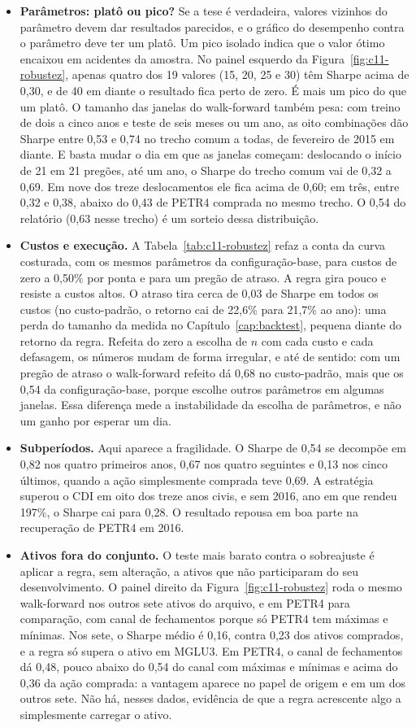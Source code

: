 \begin{itemize}[itemsep=4pt]
  \item \textbf{Parâmetros: platô ou pico?} Se a tese é verdadeira, valores vizinhos do parâmetro devem dar resultados parecidos, e o gráfico do desempenho contra o parâmetro deve ter um platô. Um pico isolado indica que o valor ótimo encaixou em acidentes da amostra. No painel esquerdo da Figura~\ref{fig:c11-robustez}, apenas quatro dos 19 valores (15, 20, 25 e 30) têm Sharpe acima de 0,30, e de 40 em diante o resultado fica perto de zero. É mais um pico do que um platô. O tamanho das janelas do walk-forward também pesa: com treino de dois a cinco anos e teste de seis meses ou um ano, as oito combinações dão Sharpe entre 0,53 e 0,74 no trecho comum a todas, de fevereiro de 2015 em diante. E basta mudar o dia em que as janelas começam: deslocando o início de 21 em 21 pregões, até um ano, o Sharpe do trecho comum vai de 0,32 a 0,69. Em nove dos treze deslocamentos ele fica acima de 0,60; em três, entre 0,32 e 0,38, abaixo do 0,43 de PETR4 comprada no mesmo trecho. O 0,54 do relatório (0,63 nesse trecho) é um sorteio dessa distribuição.
  \item \textbf{Custos e execução.} A Tabela~\ref{tab:c11-robustez} refaz a conta da curva costurada, com os mesmos parâmetros da configuração-base, para custos de zero a 0,50\% por ponta e para um pregão de atraso. A regra gira pouco e resiste a custos altos. O atraso tira cerca de 0,03 de Sharpe em todos os custos (no custo-padrão, o retorno cai de 22,6\% para 21,7\% ao ano): uma perda do tamanho da medida no Capítulo~\ref{cap:backtest}, pequena diante do retorno da regra. Refeita do zero a escolha de $n$ com cada custo e cada defasagem, os números mudam de forma irregular, e até de sentido: com um pregão de atraso o walk-forward refeito dá 0,68 no custo-padrão, mais que os 0,54 da configuração-base, porque escolhe outros parâmetros em algumas janelas. Essa diferença mede a instabilidade da escolha de parâmetros, e não um ganho por esperar um dia.
  \item \textbf{Subperíodos.} Aqui aparece a fragilidade. O Sharpe de 0,54 se decompõe em 0,82 nos quatro primeiros anos, 0,67 nos quatro seguintes e 0,13 nos cinco últimos, quando a ação simplesmente comprada teve 0,69. A estratégia superou o CDI em oito dos treze anos civis, e sem 2016, ano em que rendeu 197\%, o Sharpe cai para 0,28. O resultado repousa em boa parte na recuperação de PETR4 em 2016.
  \item \textbf{Ativos fora do conjunto.} O teste mais barato contra o sobreajuste é aplicar a regra, sem alteração, a ativos que não participaram do seu desenvolvimento. O painel direito da Figura~\ref{fig:c11-robustez} roda o mesmo walk-forward nos outros sete ativos do arquivo, e em PETR4 para comparação, com canal de fechamentos porque só PETR4 tem máximas e mínimas. Nos sete, o Sharpe médio é 0,16, contra 0,23 dos ativos comprados, e a regra só supera o ativo em MGLU3. Em PETR4, o canal de fechamentos dá 0,48, pouco abaixo do 0,54 do canal com máximas e mínimas e acima do 0,36 da ação comprada: a vantagem aparece no papel de origem e em um dos outros sete. Não há, nesses dados, evidência de que a regra acrescente algo a simplesmente carregar o ativo.

\end{itemize}
